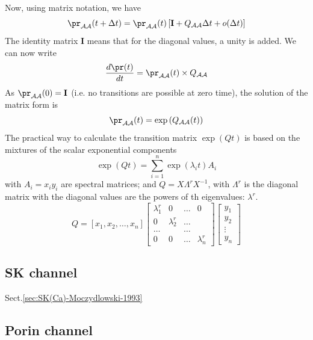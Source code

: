 Now, using matrix notation, we have
\begin{equation}
\pr_\mathcal{AA}(t+\Delta t) = \pr_\mathcal{AA}(t) \left[ \mathbf{I} +
Q_\mathcal{AA} \Delta t + o(\Delta t) \right]
\end{equation}
The identity matrix $\mathbf{I}$ means that for the diagonal values, a
unity is added. We can now write
\begin{equation}
\frac{d\pr(t)}{dt} = \pr_\mathcal{AA}(t)\times Q_\mathcal{AA}
\end{equation}
As $\pr_\mathcal{AA}(0)=\mathbf{I}$ (i.e. no transitions are possible at zero
time), the solution of the matrix form is
\begin{equation}
\pr_\mathcal{AA}(t) = \exp \left( Q_\mathcal{AA}(t) \right)
\end{equation}
The practical way to calculate the transition matrix $\exp(Qt)$ is based on
the mixtures of the scalar exponential components
\begin{equation}
\exp(Qt) = \sum\limits_{i=1}^n \exp(\lambda_i t)A_i
\end{equation}
with $A_i  = x_i y_i$ are spectral matrices; and $Q=X \Lambda^r X^{-1}$, with
$\Lambda^r$ is the diagonal matrix with the diagonal values are the powers of th
eigenvalues: $\lambda^r$.
\begin{equation}
Q = \left[ x_1, x_2 , \ldots, x_n \right] \left[\begin{array}{cccc}
\lambda_1^r & 0 & \ldots & 0 \\
0 & \lambda_2^r & \ldots & \\
\ldots & & \ldots \\
0 & 0 & \ldots & \lambda_n^r
\end{array}\right] \left[\begin{array}{c}
y_1 \\
y_2 \\
\vdots \\
y_n
\end{array}
\right]
\end{equation}


\subsection{SK channel }

Sect.\ref{sec:SK(Ca)-Moczydlowski-1993}


\subsection{Porin channel}
\label{sec:porin}

